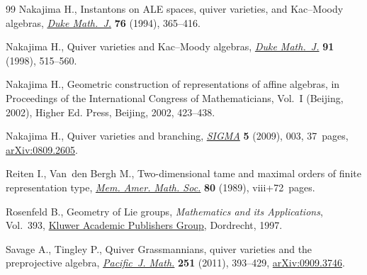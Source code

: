 \begin{thebibliography}{99}
Nakajima H., Instantons on {ALE} spaces, quiver varieties, and {K}ac--{M}oody
 algebras, \href{https://doi.org/10.1215/S0012-7094-94-07613-8}{\textit{Duke Math.~J.}} \textbf{76} (1994), 365--416.

Nakajima H., Quiver varieties and {K}ac--{M}oody algebras, \href{https://doi.org/10.1215/S0012-7094-98-09120-7}{\textit{Duke
 Math.~J.}} \textbf{91} (1998), 515--560.

Nakajima H., Geometric construction of representations of affine algebras, in
 Proceedings of the {I}nternational {C}ongress of {M}athematicians, {V}ol.~{I}
 ({B}eijing, 2002), Higher Ed. Press, Beijing, 2002, 423--438.

Nakajima H., Quiver varieties and branching, \href{https://doi.org/10.3842/SIGMA.2009.003}{\textit{SIGMA}} \textbf{5} (2009),
 003, 37~pages, \href{https://arxiv.org/abs/0809.2605}{arXiv:0809.2605}.

Reiten I., Van~den Bergh M., Two-dimensional tame and maximal orders of finite
 representation type, \href{https://doi.org/10.1090/memo/0408}{\textit{Mem. Amer. Math. Soc.}} \textbf{80} (1989),
 viii+72~pages.

Rosenfeld B., Geometry of {L}ie groups, \textit{Mathematics and its
 Applications}, Vol.~393, \href{https://doi.org/10.1007/978-1-4757-5325-7}{Kluwer Academic Publishers Group}, Dordrecht, 1997.

Savage A., Tingley P., Quiver {G}rassmannians, quiver varieties and the
 preprojective algebra, \href{https://doi.org/10.2140/pjm.2011.251.393}{\textit{Pacific~J. Math.}} \textbf{251} (2011),
 393--429, \href{https://arxiv.org/abs/0909.3746}{arXiv:0909.3746}.

\end{thebibliography}
